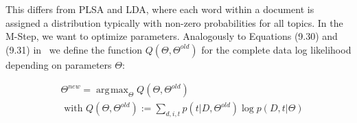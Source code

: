\documentclass[twocolumn,10]{article}
\newcommand{\ci}{~\cite} \newcommand{\re}{~\ref} \newcommand{\ma}{\mathbb}
\DeclareMathOperator*{\argmax}{\arg\!\max}
\begin{document}
	This differs from PLSA and LDA, where each word within a document is assigned a distribution typically with non-zero probabilities for all topics. 
	In the M-Step, we want to optimize parameters. Analogously to Equations (9.30) and (9.31) in\ci{bis06} we define the function $Q(\Theta,\Theta^{old})$ for the complete data log likelihood depending on parameters  $\Theta$:
	\begin{small}\begin{equation}	
		\begin{aligned}
		&\Theta^{new} = \argmax_{\Theta} Q(\Theta,\Theta^{old}) \\ &\text{ with } 	Q(\Theta,\Theta^{old}):= \sum_{d,i,t}  p(t|D,\Theta^{old}) \log  p(D,t|\Theta)  \label{eq:opt}		
		\end{aligned}   \end{equation} 
	\end{small}
	\vspace{-8pt}
	
\end{document}
